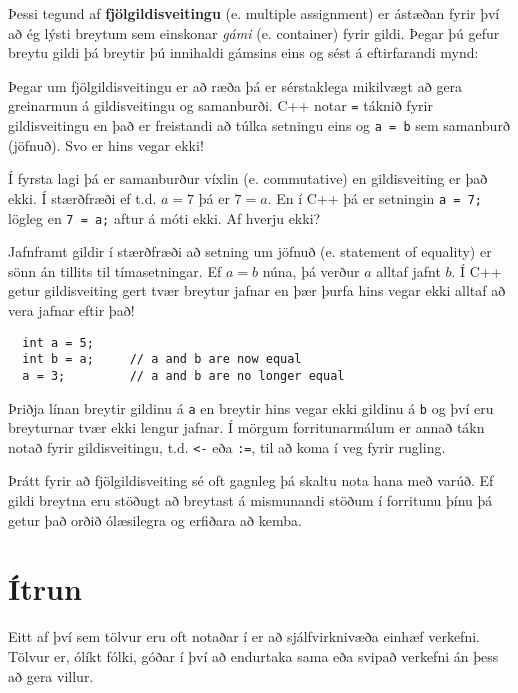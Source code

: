 Þessi tegund af {\bf fjölgildisveitingu} (e. multiple assignment) er ástæðan fyrir því að
ég lýsti breytum sem einskonar {\em gámi} (e. container) fyrir gildi.
Þegar þú gefur breytu gildi þá breytir þú innihaldi gámsins eins og sést á eftirfarandi mynd:

\vspace{0.1in}
\centerline{}
\vspace{0.1in}

Þegar um fjölgildisveitingu er að ræða þá er sérstaklega mikilvægt að gera greinarmun á gildisveitingu og samanburði.
C++ notar {\tt =} táknið fyrir gildisveitingu en það er freistandi að túlka setningu eins og {\tt a = b} sem samanburð (jöfnuð).
Svo er hins vegar ekki!

Í fyrsta lagi þá er samanburður víxlin (e. commutative) en gildisveiting er það ekki.
Í stærðfræði ef t.d. $a = 7$ þá er $7 = a$.
En í C++ þá er setningin {\tt a = 7;} lögleg en {\tt 7 = a;} aftur á móti ekki. Af hverju ekki?

Jafnframt gildir í stærðfræði að setning um jöfnuð (e. statement of equality) er sönn án tillits til tímasetningar.
Ef $a = b$ núna, þá verður $a$ alltaf jafnt $b$.
Í C++ getur gildisveiting gert tvær breytur jafnar en þær þurfa hins vegar ekki alltaf að vera jafnar eftir það!

\begin{verbatim}
  int a = 5;
  int b = a;     // a and b are now equal
  a = 3;         // a and b are no longer equal
\end{verbatim}
%
Þriðja línan breytir gildinu á {\tt a} en breytir hins vegar ekki gildinu á {\tt b} og því eru breyturnar tvær ekki lengur jafnar.
Í mörgum forritunarmálum er annað tákn notað fyrir gildisveitingu, t.d. {\tt <-} eða {\tt :=}, til að koma í veg fyrir rugling.

Þrátt fyrir að fjölgildisveiting sé oft gagnleg þá skaltu nota hana með varúð.
Ef gildi breytna eru stöðugt að breytast á mismunandi stöðum í forritunu þínu þá getur það orðið ólæsilegra og erfiðara að kemba.

\section{Ítrun}

Eitt af því sem tölvur eru oft notaðar í er að sjálfvirknivæða einhæf verkefni.
Tölvur er, ólíkt fólki, góðar í því að endurtaka sama eða svipað verkefni án þess að gera villur.

